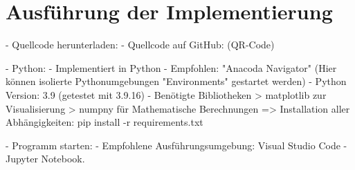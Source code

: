 \chapter{Ausführung der Implementierung}

- Quellcode herunterladen:
	- Quellcode auf GitHub: (QR-Code)

- Python:
	- Implementiert in Python
	- Empfohlen: "Anacoda Navigator" (Hier können isolierte Pythonumgebungen "Environments" gestartet werden)
	- Python Version: 3.9 (getestet mit 3.9.16)
	- Benötigte Bibliotheken
		> matplotlib zur Visualisierung
		> numpny für Mathematische Berechnungen
		=> Installation aller Abhängigkeiten: pip install -r requirements.txt

- Programm starten:
	- Empfohlene Ausführungsumgebung: Visual Studio Code
	- Jupyter Notebook. 